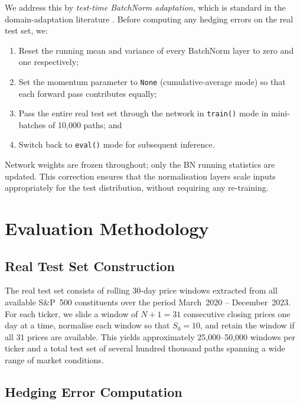 We address this by \emph{test-time BatchNorm adaptation}, which is standard
in the domain-adaptation literature \citep{schneider2020improving}.  Before
computing any hedging errors on the real test set, we:
\begin{enumerate}
  \item Reset the running mean and variance of every BatchNorm layer to zero
        and one respectively;
  \item Set the momentum parameter to \texttt{None} (cumulative-average mode)
        so that each forward pass contributes equally;
  \item Pass the entire real test set through the network in
        \texttt{train()} mode in mini-batches of 10{,}000 paths; and
  \item Switch back to \texttt{eval()} mode for subsequent inference.
\end{enumerate}
Network weights are frozen throughout; only the BN running statistics are
updated.  This correction ensures that the normalisation layers scale
inputs appropriately for the test distribution, without requiring any
re-training.

\section{Evaluation Methodology}%
\label{sec:gad_eval}

\subsection{Real Test Set Construction}

The real test set consists of rolling 30-day price windows extracted from
all available S\&P~500 constituents over the period
March~2020 -- December~2023.  For each ticker, we slide a window of
$N+1 = 31$ consecutive closing prices one day at a time, normalise each
window so that $S_0 = 10$, and retain the window if all 31 prices are
available.  This yields approximately 25{,}000--50{,}000 windows per ticker
and a total test set of several hundred thousand paths spanning a wide
range of market conditions.

\subsection{Hedging Error Computation}

